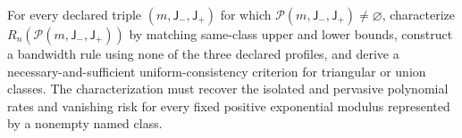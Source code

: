 For every declared triple \((m,\mathsf J_{-},\mathsf J_{+})\) for which \(\mathcal P(m,\mathsf J_{-},\mathsf J_{+})\ne\varnothing\), characterize \(R_n(\mathcal P(m,\mathsf J_{-},\mathsf J_{+}))\) by matching same-class upper and lower bounds, construct a bandwidth rule using none of the three declared profiles, and derive a necessary-and-sufficient uniform-consistency criterion for triangular or union classes. The characterization must recover the isolated and pervasive polynomial rates and vanishing risk for every fixed positive exponential modulus represented by a nonempty named class.